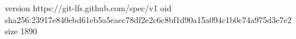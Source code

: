 version https://git-lfs.github.com/spec/v1
oid sha256:23917e840ebd61eb5a5eaec78df2e2c6c8bf1d90a15a094c1b0c74a975d3e7e2
size 1890
